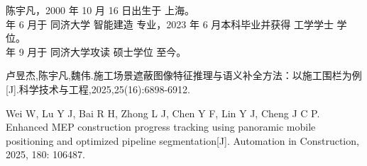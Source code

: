 \noindent 陈宇凡，2000 年 10 月 16 日出生于 上海。\\
 年 6 月于 同济大学 智能建造 专业，2023 年 6 月本科毕业并获得 工学学士 学位。 \\
 年 9 月于 同济大学攻读 硕士学位 至今。

\begin{enumerate}[{[}1{]}]
\item 卢昱杰,陈宇凡,魏伟.施工场景遮蔽图像特征推理与语义补全方法：以施工围栏为例[J].科学技术与工程,2025,25(16):6898-6912.
\item Wei W, Lu Y J, Bai R H, Zhong L J, Chen Y F, Lin Y J, Cheng J C P. Enhanced MEP construction progress tracking using panoramic mobile positioning and optimized pipeline segmentation[J]. Automation in Construction, 2025, 180: 106487.
\end{enumerate}




